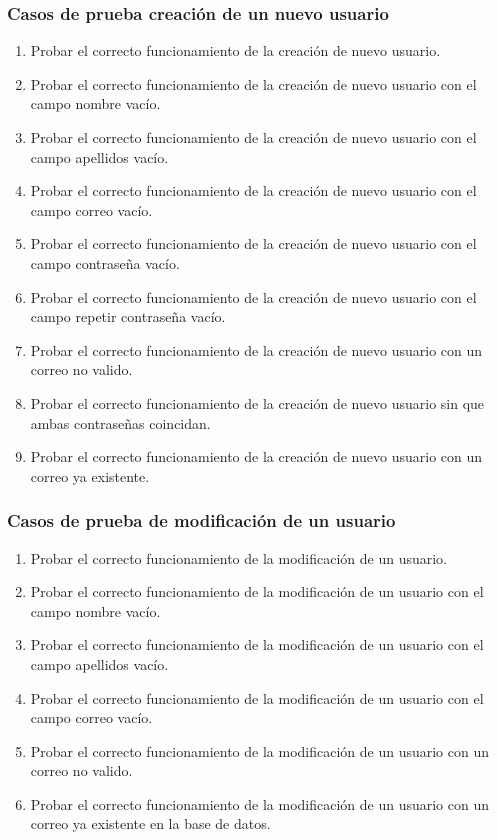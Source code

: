 \subsubsection{Casos de prueba creación de un nuevo usuario}

\begin{enumerate}
    \item Probar el correcto funcionamiento de la creación de nuevo usuario.
    \item Probar el correcto funcionamiento de la creación de nuevo usuario con el campo nombre vacío.
    \item Probar el correcto funcionamiento de la creación de nuevo usuario con el campo apellidos vacío.
    \item Probar el correcto funcionamiento de la creación de nuevo usuario con el campo correo vacío.
    \item Probar el correcto funcionamiento de la creación de nuevo usuario con el campo contraseña vacío.
    \item Probar el correcto funcionamiento de la creación de nuevo usuario con el campo repetir contraseña vacío.
    \item Probar el correcto funcionamiento de la creación de nuevo usuario con un correo no valido.
    \item Probar el correcto funcionamiento de la creación de nuevo usuario sin que ambas contraseñas coincidan.
    \item Probar el correcto funcionamiento de la creación de nuevo usuario con un correo ya existente.
\end{enumerate}

\subsubsection{Casos de prueba de modificación de un usuario}

\begin{enumerate}
    \item Probar el correcto funcionamiento de la modificación de un usuario.
    \item Probar el correcto funcionamiento de la modificación de un usuario con el campo nombre vacío.
    \item Probar el correcto funcionamiento de la modificación de un usuario con el campo apellidos vacío.
    \item Probar el correcto funcionamiento de la modificación de un usuario con el campo correo vacío.
    \item Probar el correcto funcionamiento de la modificación de un usuario con un correo no valido.
    \item Probar el correcto funcionamiento de la modificación de un usuario con un correo ya existente en la base de datos.
\end{enumerate}

